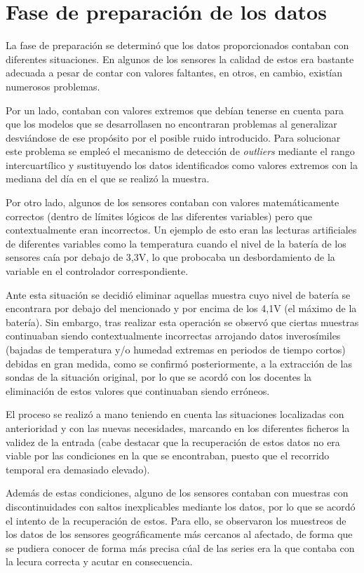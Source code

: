 \section{Fase de preparación de los datos}
La fase de preparación se determinó que los datos proporcionados contaban con diferentes situaciones. En algunos
de los sensores la calidad de estos era bastante adecuada a pesar de contar con valores faltantes, en otros, en cambio,
existían numerosos problemas.

Por un lado, contaban con valores extremos que debían tenerse en cuenta para que los modelos que se desarrollasen no 
encontraran problemas al generalizar desviándose de ese propósito por el posible ruido introducido.
Para solucionar este problema se empleó el mecanismo de detección de \textit{outliers} mediante el rango intercuartílico
y sustituyendo los datos identificados como valores extremos con la mediana del día en el que se realizó la muestra.

Por otro lado, algunos de los sensores contaban con valores matemáticamente correctos (dentro de límites lógicos de las 
diferentes variables) pero que contextualmente eran incorrectos. Un ejemplo de esto eran las lecturas artificiales de 
diferentes variables como la temperatura cuando el nivel de la batería de los sensores caía por debajo de 3,3V, lo que
probocaba un desbordamiento de la variable en el controlador correspondiente.

Ante esta situación se decidió eliminar aquellas muestra cuyo nivel de batería se encontrara por debajo del mencionado
y por encima de los 4,1V (el máximo de la batería). Sin embargo, tras realizar esta operación se observó que ciertas 
muestras continuaban siendo contextualmente incorrectas arrojando datos inverosímiles (bajadas de temperatura y/o 
humedad extremas en periodos de tiempo cortos) debidas en gran medida, como se confirmó posteriormente, 
a la extracción de las sondas de la situación original, por lo que se acordó con los docentes la eliminación de estos 
valores que continuaban siendo erróneos.

El proceso se realizó a mano teniendo en cuenta las situaciones localizadas con anterioridad y con las nuevas necesidades,
marcando en los diferentes ficheros la validez de la entrada (cabe destacar que la recuperación de estos datos no era viable 
por las condiciones en la que se encontraban, puesto que el recorrido temporal era demasiado elevado).

Además de estas condiciones, alguno de los sensores contaban con muestras con discontinuidades con saltos inexplicables 
mediante los datos, por lo que se acordó el intento de la recuperación de estos. Para ello, se observaron los muestreos
de los datos de los sensores geográficamente más cercanos al afectado, de forma que se pudiera conocer de forma más 
precisa cúal de las series era la que contaba con la lecura correcta y acutar en consecuencia.

